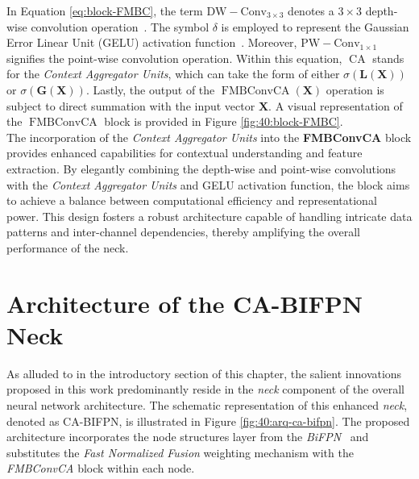 In Equation \ref{eq:block-FMBC}, the term \( \operatorname{DW-Conv_{3\times 3}} \) denotes a \( 3 \times 3 \) depth-wise convolution operation~\cite{DBLP:journals/corr/abs-1709-01507}. The symbol \( \delta \) is employed to represent the Gaussian Error Linear Unit (GELU) activation function~\cite{hendrycks2023gaussian}. Moreover, \( \operatorname{PW-Conv_{1\times 1}} \) signifies the point-wise convolution operation. Within this equation, \( \operatorname{CA} \) stands for the \textit{Context Aggregator Units}, which can take the form of either \( \sigma\left(\mathbf{L}(\mathbf{X})\right) \) or \( \sigma\left(\mathbf{G}(\mathbf{X})\right) \). Lastly, the output of the \(\operatorname{FMBConvCA}\left(\mathbf{X}\right)\) operation is subject to direct summation with the input vector \( \mathbf{X} \).
A visual representation of the \(\operatorname{FMBConvCA}\) block is provided in Figure \ref{fig:40:block-FMBC}.\\

The incorporation of the \textit{Context Aggregator Units} into the \textbf{FMBConvCA} block provides enhanced capabilities for contextual understanding and feature extraction. By elegantly combining the depth-wise and point-wise convolutions with the \textit{Context Aggregator Units} and GELU activation function, the block aims to achieve a balance between computational efficiency and representational power. This design fosters a robust architecture capable of handling intricate data patterns and inter-channel dependencies, thereby amplifying the overall performance of the neck.

\section{Architecture of the CA-BIFPN Neck} \label{sec:cabifpn-neck}
As alluded to in the introductory section of this chapter, the salient innovations proposed in this work predominantly reside in the \textit{neck} component of the overall neural network architecture. The schematic representation of this enhanced \textit{neck}, denoted as CA-BIFPN, is illustrated in Figure \ref{fig:40:arq-ca-bifpn}. The proposed architecture incorporates the node structures layer from the \textit{BiFPN}~\cite{DBLP:journals/corr/abs-1911-09070} and substitutes the \textit{Fast Normalized Fusion} weighting mechanism with the \textit{FMBConvCA} block within each node.\\

